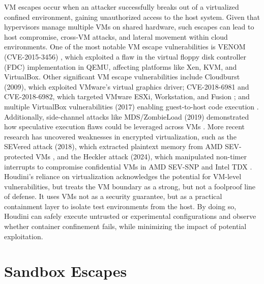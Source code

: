 \documentclass[12pt]{report}
\begin{document}
\begin{doublespace}
VM escapes occur when an attacker successfully breaks out of a virtualized confined environment, gaining unauthorized access to the host system. Given that hypervisors manage multiple VMs on shared hardware, such escapes can lead to host compromise, cross-VM attacks, and lateral movement within cloud environments. One of the most notable VM escape vulnerabilities is VENOM (CVE-2015-3456) \cite{abdoul2018novel}, which exploited a flaw in the virtual floppy disk controller (FDC) implementation in QEMU, affecting platforms like Xen, KVM, and VirtualBox. Other significant VM escape vulnerabilities include Cloudburst (2009), which exploited VMware's virtual graphics driver; CVE-2018-6981 and CVE-2018-6982, which targeted VMware ESXi, Workstation, and Fusion \cite{vmware2018escape}; and multiple VirtualBox vulnerabilities (2017) enabling guest-to-host code execution \cite{virtualbox2017bugs}. Additionally, side-channel attacks like MDS/ZombieLoad (2019) demonstrated how speculative execution flaws could be leveraged across VMs \cite{mds2019attack}. More recent research has uncovered weaknesses in encrypted virtualization, such as the SEVered attack (2018), which extracted plaintext memory from AMD SEV-protected VMs \cite{severed2018}, and the Heckler attack (2024), which manipulated non-timer interrupts to compromise confidential VMs in AMD SEV-SNP and Intel TDX \cite{heckler2024}.\\

Houdini’s reliance on virtualization acknowledges the potential for VM-level vulnerabilities, but treats the VM boundary as a strong, but not a foolproof line of defense. It uses VMs not as a security guarantee, but as a practical containment layer to isolate test environments from the host. By doing so, Houdini can safely execute untrusted or experimental configurations and observe whether container confinement fails, while minimizing the impact of potential exploitation.

\section{Sandbox Escapes} 


\end{doublespace}
\end{document}
